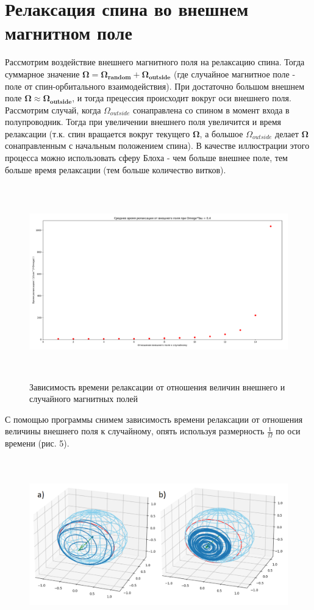 \documentclass[12pt,oneside]{book}
\begin{document}
{{\section{Релаксация спина во внешнем магнитном поле}
	Рассмотрим воздействие внешнего магнитного поля на релаксацию спина. Тогда суммарное значение $\bm{\Omega} = \bm{{\Omega}_{random}} + \bm{{\Omega}_{outside}}$ (где случайное магнитное поле - поле от спин-орбитального взаимодействия). При достаточно большом внешнем поле  $\bm{\Omega} \approx \bm{{\Omega}_{outside}}$, и тогда прецессия происходит вокруг оси внешнего поля.
	Рассмотрим случай, когда ${\Omega}_{outside}$ сонаправлена со спином в момент входа в полупроводник. Тогда при увеличении внешнего поля увеличится и время релаксации (т.к. спин вращается вокруг текущего $\bm{\Omega}$, а большое ${\Omega}_{outside}$  делает $\bm{\Omega}$ сонаправленным с начальным положением спина).
	\newline
	В качестве иллюстрации этого процесса можно использовать сферу Блоха - чем больше внешнее поле, тем больше время релаксации (тем больше количество витков).
	\begin{figure}[h!]
		\centering
		\includegraphics[width = 16cm, height = 8.41cm]{img/Field_from1to15_0,4_2000.png}
		\caption{Зависимость времени релаксации от отношения величин внешнего и случайного магнитных полей}
		\label{fig:f5}
	\end{figure}
	С помощью программы снимем зависимость времени релаксации от отношения величины внешнего поля к случайному, опять используя размерность $\frac{1}{\Omega}$ по оси времени (рис. 5).
	\begin{figure}[h!]
		\centering
		\includegraphics[width = 16cm, height = 7.49cm]{img/Bloch_Sphere_0,4.png}

\end{figure}}}
\end{document}
